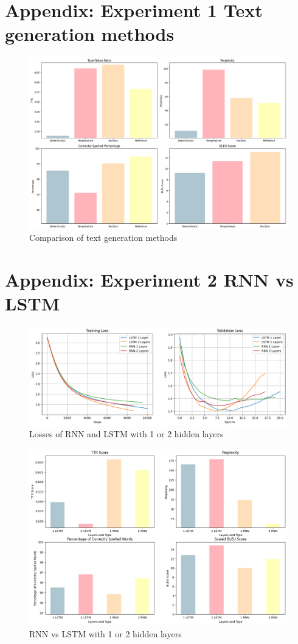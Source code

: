 \documentclass{article}
\begin{document}
\section*{Appendix: Experiment 1 Text generation methods}
\begin{figure}[H]
    \centering
    \includegraphics[width=0.8\linewidth]{figures/text_generation.png}
    \caption{Comparison of text generation methods}
    \label{fig:text_generation}
\end{figure}

\section*{Appendix: Experiment 2 RNN vs LSTM}
\begin{figure}[H]
    \centering
    \includegraphics[width=\linewidth]{figures/RNN_LSTM_comparison.png}
    \caption{Losses of RNN and LSTM with 1 or 2 hidden layers}
    \label{fig:loss_rnn_lstm}
\end{figure}

\begin{figure}[H]
    \centering
    \includegraphics[width=0.8\linewidth]{figures/text_rnn_vs_lstm.png}
    \caption{RNN vs LSTM with 1 or 2 hidden layers}
    \label{fig:text_rnn_lstm}
\end{figure}
\end{document}
